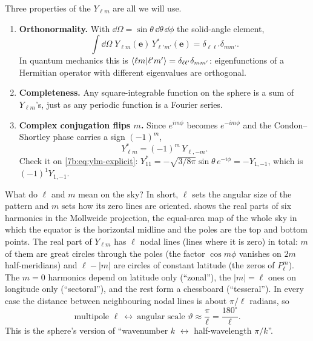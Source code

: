 Three properties of the $Y_{\ell m}$ are all we will use.
\begin{enumerate}[itemsep=2pt]
\item \textbf{Orthonormality.} With $\dd\Omega=\sin\theta\,\dd\theta\,\dd\phi$ the solid-angle
  element,
  \begin{equation}
    \int\dd\Omega\;Y_{\ell m}(\bm e)\,Y^*_{\ell'm'}(\bm e)=\delta_{\ell\ell'}\delta_{mm'} .
    \label{7b:eq:orthonormal}
  \end{equation}
  In quantum mechanics this is $\langle \ell m\vert \ell'm'\rangle=\delta_{\ell\ell'}\delta_{mm'}$:
  eigenfunctions of a Hermitian operator with different eigenvalues are orthogonal.
\item \textbf{Completeness.} Any square-integrable function on the sphere is a sum of
  $Y_{\ell m}$'s, just as any periodic function is a Fourier series.
\item \textbf{Complex conjugation flips $m$.} Since $e^{im\phi}$ becomes $e^{-im\phi}$ and the
  Condon--Shortley phase carries a sign $(-1)^m$,
  \begin{equation}
    Y^*_{\ell m}=(-1)^m\,Y_{\ell,-m} .
    \label{7b:eq:ylm-conj}
  \end{equation}
  Check it on \eqref{7b:eq:ylm-explicit}: $Y_{11}^*=-\sqrt{3/8\pi}\sin\theta\,e^{-i\phi}=-Y_{1,-1}$,
  which is $(-1)^1Y_{1,-1}$.
\end{enumerate}

What do $\ell$ and $m$ mean on the sky? In short, $\ell$ sets the angular size of the pattern
and $m$ sets how its zero lines are oriented.  shows the real parts of
six harmonics in the Mollweide projection, the equal-area map of the whole sky in which the
equator is the horizontal midline and the poles are the top and bottom points. The real part of
$Y_{\ell m}$ has $\ell$ nodal lines (lines where it is zero) in total: $m$ of them are great circles through the poles
(the factor $\cos m\phi$ vanishes on $2m$ half-meridians) and $\ell-|m|$ are circles of
constant latitude (the zeros of $P_\ell^m$). The $m=0$ harmonics depend on latitude only
(``zonal''), the $|m|=\ell$ ones on longitude only (``sectoral''), and the rest form a
chessboard (``tesseral''). In every case the distance between neighbouring nodal lines is about
$\pi/\ell$ radians, so
\begin{equation}
  \text{multipole }\ell\ \longleftrightarrow\ \text{angular scale }\vartheta\approx\frac{\pi}{\ell}
  =\frac{180^\circ}{\ell}.
  \label{7b:eq:ell-angle}
\end{equation}
This is the sphere's version of ``wavenumber $k$ $\leftrightarrow$ half-wavelength $\pi/k$''.


